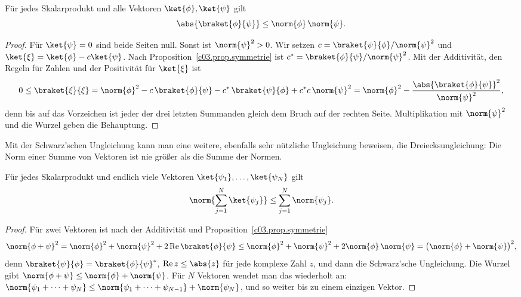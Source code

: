 \begin{proposition}\label{c03.prop.schwarz}
  Für jedes Skalarprodukt und alle Vektoren $\ket{\phi}, \ket{\psi}$ gilt
  \begin{equation}\label{c03.eq.schwarz}
    \abs{\braket{\phi}{\psi}} \leq \norm{\phi}\, \norm{\psi} .
  \end{equation}
\end{proposition}
\begin{proof}
  Für $\ket{\psi} = 0$ sind beide Seiten null. Sonst ist $\norm{\psi}^2 > 0$. Wir setzen
  $c = \braket{\psi}{\phi} / \norm{\psi}^2$ und $\ket{\xi} = \ket{\phi} - c \ket{\psi}$. Nach
  Proposition~\ref{c03.prop.symmetrie} ist $c^* = \braket{\phi}{\psi} / \norm{\psi}^2$. Mit der
  Additivität, den Regeln für Zahlen und der Positivität für $\ket{\xi}$ ist
  \begin{equation}\label{c03.eq.schwarz-beweis}
    0 \leq \braket{\xi}{\xi}
      = \norm{\phi}^2 - c\, \braket{\phi}{\psi} - c^*\, \braket{\psi}{\phi} + c^* c\, \norm{\psi}^2
      = \norm{\phi}^2 - \frac{\abs{\braket{\phi}{\psi}}^2}{\norm{\psi}^2} ,
  \end{equation}
  denn bis auf das Vorzeichen ist jeder der drei letzten Summanden gleich dem Bruch auf der
  rechten Seite. Multiplikation mit $\norm{\psi}^2$ und die Wurzel geben die Behauptung.
\end{proof}

Mit der Schwarz'schen Ungleichung kann man eine weitere, ebenfalls sehr nützliche Ungleichung
beweisen, die Dreiecksungleichung: Die Norm einer Summe von Vektoren ist nie größer als die
Summe der Normen.

\begin{proposition}[Dreiecksungleichung]\label{c03.prop.dreieck}
  Für jedes Skalarprodukt und endlich viele Vektoren $\ket{\psi_1}, \dots, \ket{\psi_N}$ gilt
  \begin{equation}\label{c03.eq.dreieck}
    \norm{\sum_{j=1}^{N} \ket{\psi_j}} \leq \sum_{j=1}^{N} \norm{\psi_j} .
  \end{equation}
\end{proposition}
\begin{proof}
  Für zwei Vektoren ist nach der Additivität und Proposition~\ref{c03.prop.symmetrie}
  \begin{equation}\label{c03.eq.dreieck-beweis}
    \norm{\phi + \psi}^2
      = \norm{\phi}^2 + \norm{\psi}^2 + 2 \operatorname{Re} \braket{\phi}{\psi}
      \leq \norm{\phi}^2 + \norm{\psi}^2 + 2 \norm{\phi}\, \norm{\psi}
      = \bigl( \norm{\phi} + \norm{\psi} \bigr)^2 ,
  \end{equation}
  denn $\braket{\psi}{\phi} = \braket{\phi}{\psi}^*$, $\operatorname{Re} z \leq \abs{z}$ für
  jede komplexe Zahl $z$, und dann die Schwarz'sche Ungleichung. Die Wurzel gibt
  $\norm{\phi + \psi} \leq \norm{\phi} + \norm{\psi}$. Für $N$ Vektoren wendet man das
  wiederholt an: $\norm{\psi_1 + \dots + \psi_N} \leq \norm{\psi_1 + \dots + \psi_{N-1}} + \norm{\psi_N}$,
  und so weiter bis zu einem einzigen Vektor.
\end{proof}

